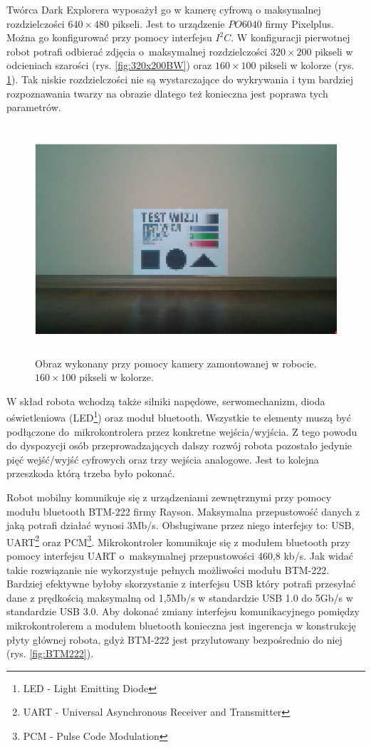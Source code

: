 Twórca Dark Explorera wyposażył go w kamerę cyfrową o maksymalnej rozdzielczości
$640\times480$ pikseli. Jest to urządzenie $PO6040$ firmy Pixelplus. Można go
konfigurować przy pomocy interfejsu $I^{2}C$. W konfiguracji pierwotnej robot
potrafi odbierać zdjęcia o~maksymalnej rozdzielczości $320\times200$ pikseli w
odcieniach szarości (rys. \ref{fig:320x200BW}) oraz $160\times100$ pikseli w
kolorze (rys. \ref{fig:160x100C}). Tak niskie rozdzielczości nie są wystarczające do
wykrywania i tym bardziej rozpoznawania twarzy na obrazie dlatego też konieczna
jest poprawa tych parametrów.

\begin{figure}[!h]
 \centering
 \includegraphics[height=85mm]{../images/ch02/160x100C.jpg}
 \caption{Obraz wykonany przy pomocy kamery zamontowanej w robocie.
 $160\times100$ pikseli w kolorze. \cite{KmakMScThesis2009}}
 \label{fig:160x100C}
\end{figure}

W skład robota wchodzą także silniki napędowe, serwomechanizm, dioda
oświetleniowa (LED\footnote{LED - Light Emitting Diode}) oraz moduł bluetooth.
Wszystkie te elementy muszą być podłączone do~mikrokontrolera przez konkretne wejścia/wyjścia. Z tego powodu do dyspozycji osób
przeprowadzających dalszy rozwój robota pozostało jedynie pięć wejść/wyjść
cyfrowych oraz trzy wejścia analogowe. Jest to kolejna przeszkoda którą trzeba
było pokonać.

Robot mobilny komunikuje się z urządzeniami zewnętrznymi przy pomocy modułu
bluetooth BTM-222 firmy Rayson. Maksymalna przepustowość danych z jaką potrafi
działać wynosi 3Mb/s. Obsługiwane przez niego interfejsy to: USB,
UART\footnote{UART - Universal Asynchronous Receiver and Transmitter} oraz
PCM\footnote{PCM - Pulse Code Modulation}. Mikrokontroler komunikuje się z
modułem bluetooth przy pomocy interfejsu UART o~maksymalnej przepustowości 460,8 kb/s. Jak widać takie rozwiązanie nie wykorzystuje pełnych możliwości modułu BTM-222. Bardziej efektywne byłoby skorzystanie z interfejsu USB który potrafi przesyłać dane z prędkością
maksymalną od 1,5Mb/s w standardzie USB 1.0 do 5Gb/s w standardzie USB 3.0. Aby
dokonać zmiany interfejsu komunikacyjnego pomiędzy mikrokontrolerem a modułem
bluetooth konieczna jest ingerencja w konstrukcję płyty głównej robota, gdyż
BTM-222 jest przylutowany bezpośrednio do niej (rys. \ref{fig:BTM222}).

